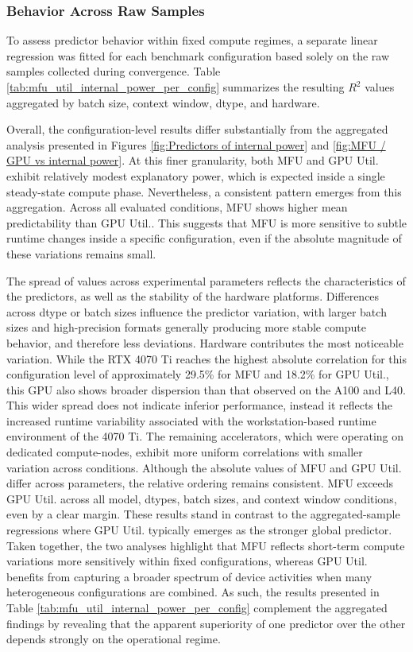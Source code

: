\documentclass[runningheads]{llncs}
\begin{document}


\subsubsection{Behavior Across Raw Samples}
To assess predictor behavior within fixed compute regimes, a separate linear regression was fitted for each benchmark configuration based solely on the raw samples collected during convergence. Table \ref{tab:mfu_util_internal_power_per_config} summarizes the resulting $R^2$ values aggregated by batch size, context window, dtype, and hardware.

Overall, the configuration-level results differ substantially from the aggregated analysis presented in Figures \ref{fig:Predictors of internal power} and \ref{fig:MFU / GPU vs internal power}. At this finer granularity, both MFU and GPU Util. exhibit relatively modest explanatory power, which is expected inside a single steady-state compute phase. Nevertheless, a consistent pattern emerges from this aggregation. Across all evaluated conditions, MFU shows higher mean predictability than GPU Util.. This suggests that MFU is more sensitive to subtle runtime changes inside a specific configuration, even if the absolute magnitude of these variations remains small.

The spread of values across experimental parameters reflects the characteristics of the predictors, as well as the stability of the hardware platforms. Differences across dtype or batch sizes influence the predictor variation, with larger batch sizes and high-precision formats generally producing more stable compute behavior, and therefore less deviations. Hardware contributes the most noticeable variation. While the RTX 4070 Ti reaches the highest absolute correlation for this configuration level of approximately 29.5\% for MFU and 18.2\% for GPU Util., this GPU also shows broader dispersion than that observed on the A100 and L40. This wider spread does not indicate inferior performance, instead it reflects the increased runtime variability associated with the workstation-based runtime environment of the 4070 Ti. The remaining accelerators, which were operating on dedicated compute-nodes, exhibit more uniform correlations with smaller variation across conditions. Although the absolute values of MFU and GPU Util. differ across parameters, the relative ordering remains consistent. MFU exceeds GPU Util. across all model, dtypes, batch sizes, and context window conditions, even by a clear margin. These results stand in contrast to the aggregated-sample regressions where GPU Util. typically emerges as the stronger global predictor. Taken together, the two analyses highlight that MFU reflects short-term compute variations more sensitively within fixed configurations, whereas GPU Util. benefits from capturing a broader spectrum of device activities when many heterogeneous configurations are combined. As such, the results presented in Table \ref{tab:mfu_util_internal_power_per_config} complement the aggregated findings by revealing that the apparent superiority of one predictor over the other depends strongly on the operational regime.
\end{document}
